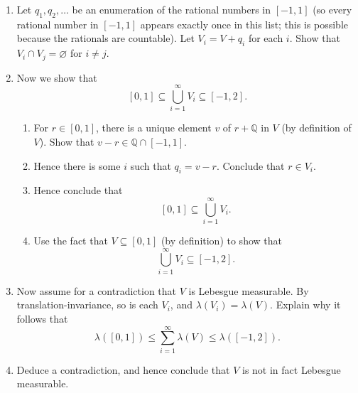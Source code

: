 \documentclass{article}
\begin{document}
\begin{enumerate}
\begin{enumerate}
\begin{enumerate}
				\end{enumerate}
			\item Let $q_1,q_2,\hdots$ be an enumeration of the rational numbers in $[-1,1]$ (so every rational number in $[-1,1]$ appears exactly once in this list; this is possible because the rationals are countable). Let $V_i=V+q_i$ for each $i$. Show that $V_i\cap V_j=\varnothing$ for $i\neq j$.
			\item Now we show that
				\[[0,1]\subseteq \bigcup_{i=1}^\infty V_i\subseteq [-1,2].\]
				\begin{enumerate}
					\item For $r\in [0,1]$, there is a unique element $v$ of $r+\mathbb{Q}$ in $V$ (by definition of $V$). Show that $v-r\in\mathbb{Q}\cap [-1,1]$.
					\item Hence there is some $i$ such that $q_i=v-r$. Conclude that $r\in V_i$.
					\item Hence conclude that
						\[[0,1]\subseteq \bigcup_{i=1}^\infty V_i.\]
					\item Use the fact that $V\subseteq [0,1]$ (by definition) to show that
						\[\bigcup_{i=1}^\infty V_i\subseteq [-1,2].\]
				\end{enumerate}
			\item Now assume for a contradiction that $V$ is Lebesgue measurable. By translation-invariance, so is each $V_i$, and $\lambda(V_i)=\lambda(V)$. Explain why it follows that
				\[\lambda([0,1])\leq \sum_{i=1}^\infty \lambda(V)\leq \lambda([-1,2]).\]
			\item Deduce a contradiction, and hence conclude that $V$ is not in fact Lebesgue measurable.
		\end{enumerate}
\end{enumerate}
\end{document}
